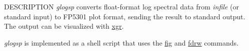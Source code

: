\begin{synopsis}
\item[glogsp] [ --F $F$] [ --O $O$ ] [ --x $X$ ] [ --y $ymin \; ymax$ ] [ --ys $YS$ ] 
              [ --p $P$ ] [ --ln $LN$ ] 
\item[\ ~~~~~~~] [ --s $S$ ] [ --l $L$ ] [ --c $comment$ ] [ {\em infile} ]
\end{synopsis}

\begin{qsection}{DESCRIPTION}
{\em glogsp} converts float-format log spectral data 
from {\em infile} (or standard input)
to FP5301 plot format, 
sending the result to standard output. 
The output can be visualized with \hyperlink{xgr}{xgr}.

{\em glogsp} is implemented as a shell script 
that uses the \hyperlink{fig}{fig} and \hyperlink{fdrw}{fdrw} commands.
\end{qsection}

